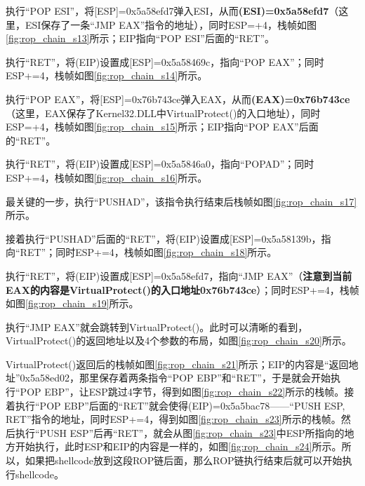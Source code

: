 \documentclass[bachelor]{thesis-uestc}
\begin{document}
执行``POP ESI''，将[ESP]=0x5a58efd7弹入ESI，从而\textbf{(ESI)=0x5a58efd7}（这里，ESI保存了一条``JMP EAX''指令的地址），同时ESP=+4，栈帧如图\ref{fig:rop_chain_s13}所示；EIP指向``POP ESI''后面的``RET''。\par

执行``RET''，将(EIP)设置成[ESP]=0x5a58469c，指向``POP EAX''；同时ESP+=4，栈帧如图\ref{fig:rop_chain_s14}所示。\par

执行``POP EAX''，将[ESP]=0x76b743ce弹入EAX，从而\textbf{(EAX)=0x76b743ce}（这里，EAX保存了Kernel32.DLL中VirtualProtect()的入口地址），同时ESP=+4，栈帧如图\ref{fig:rop_chain_s15}所示；EIP指向``POP EAX''后面的``RET''。\par

执行``RET''，将(EIP)设置成[ESP]=0x5a5846a0，指向``POPAD''；同时ESP+=4，栈帧如图\ref{fig:rop_chain_s16}所示。\par

最关键的一步，执行``PUSHAD''，该指令执行结束后栈帧如图\ref{fig:rop_chain_s17}所示。\par

接着执行``PUSHAD''后面的``RET''，将(EIP)设置成[ESP]=0x5a58139b，指向``RET''；同时ESP+=4，栈帧如图\ref{fig:rop_chain_s18}所示。\par

执行``RET''，将(EIP)设置成[ESP]=0x5a58efd7，指向``JMP EAX''（\textbf{注意到当前EAX的内容是VirtualProtect()的入口地址0x76b743ce}）；同时ESP+=4，栈帧如图\ref{fig:rop_chain_s19}所示。\par

执行``JMP EAX''就会跳转到VirtualProtect()。此时可以清晰的看到，VirtualProtect()的返回地址以及4个参数的布局，如图\ref{fig:rop_chain_s20}所示。\par

VirtualProtect()返回后的栈帧如图\ref{fig:rop_chain_s21}所示；EIP的内容是``返回地址''0x5a58ed02，那里保存着两条指令``POP EBP''和``RET''，于是就会开始执行``POP EBP''，让ESP跳过4字节，得到如图\ref{fig:rop_chain_s22}所示的栈帧。接着执行``POP EBP''后面的``RET''就会使得(EIP)=0x5a5bac78——``PUSH ESP, RET''指令的地址，同时ESP+=4，得到如图\ref{fig:rop_chain_s23}所示的栈帧。然后执行``PUSH ESP''后再``RET''，就会从图\ref{fig:rop_chain_s23}中ESP所指向的地方开始执行，此时ESP和EIP的内容是一样的，如图\ref{fig:rop_chain_s24}所示。所以，如果把shellcode放到这段ROP链后面，那么ROP链执行结束后就可以开始执行shellcode。\par
\end{document}
